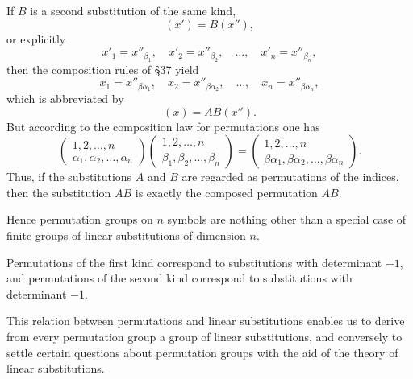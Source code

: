 \documentclass[11pt]{article}
\begin{document}
If $B$ is a second substitution of the same kind,
\[
(x') = B(x''),
\tag{35}
\]
or explicitly
\[
x'_1=x''_{\beta_1},\quad x'_2=x''_{\beta_2},\quad \dots,\quad x'_n=x''_{\beta_n},
\tag{36}
\]
then the composition rules of \S 37 yield
\[
x_1=x''_{\beta\alpha_1},\quad x_2=x''_{\beta\alpha_2},\quad \dots,\quad x_n=x''_{\beta\alpha_n},
\tag{37}
\]
which is abbreviated by
\[
(x)=AB(x'').
\tag{38}
\]
But according to the composition law for permutations one has
\[
\begin{pmatrix}
1,2,\dots,n\\
\alpha_1,\alpha_2,\dots,\alpha_n
\end{pmatrix}
\begin{pmatrix}
1,2,\dots,n\\
\beta_1,\beta_2,\dots,\beta_n
\end{pmatrix}
=
\begin{pmatrix}
1,2,\dots,n\\
\beta\alpha_1,\beta\alpha_2,\dots,\beta\alpha_n
\end{pmatrix}.
\tag{39}
\]
Thus, if the substitutions $A$ and $B$ are regarded as permutations of the indices, then the substitution $AB$ is exactly the composed permutation $AB$.

Hence permutation groups on $n$ symbols are nothing other than a special case of finite groups of linear substitutions of dimension $n$.

Permutations of the first kind correspond to substitutions with determinant $+1$, and permutations of the second kind correspond to substitutions with determinant $-1$.

This relation between permutations and linear substitutions enables us to derive from every permutation group a group of linear substitutions, and conversely to settle certain questions about permutation groups with the aid of the theory of linear substitutions.
\end{document}
